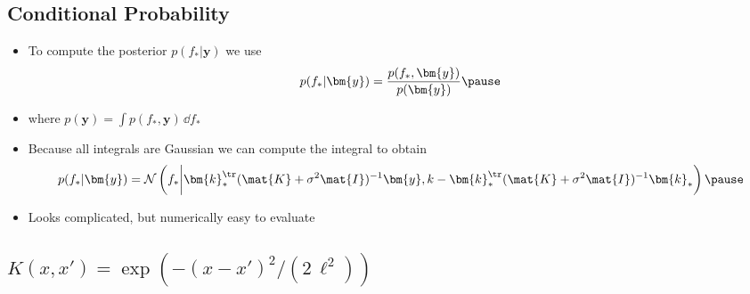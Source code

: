 \begin{slide}
\section{Conditional Probability}

\begin{PauseHighLight}
  \begin{itemize}
  \item To compute the posterior $p(f_*|\bm{y})$ we use
    \begin{align*}
      p(f_*|\bm{y}) = \frac{p(f_*,\bm{y})}{p(\bm{y})}\pause
    \end{align*}
  \item where $p(\bm{y}) = \int p(f_*,\bm{y}) \, \dd f_*$\pause
  \item Because all integrals are Gaussian we can compute the integral
    to obtain
    \begin{align*}
      p(f_*|\bm{y}) = \mathcal{N}\left( f_* \bigg\vert
      \bm{k}_*^\tr(\mat{K} + \sigma^2 \mat{I})^{-1} \bm{y}, 
      k - \bm{k}_*^\tr(\mat{K} + \sigma^2 \mat{I})^{-1} \bm{k}_* \right)\pause
    \end{align*}
  \item Looks complicated, but numerically easy to evaluate\pause
  \end{itemize}
\end{PauseHighLight}


\end{slide}



\begin{slide}
\section[-2]{$K(x,x') = \exp(-(x-x')^2/(2\,\ell^2))$}
  
\pb\pause{}
\begin{center}
  \pause
\end{center}

\end{slide}


